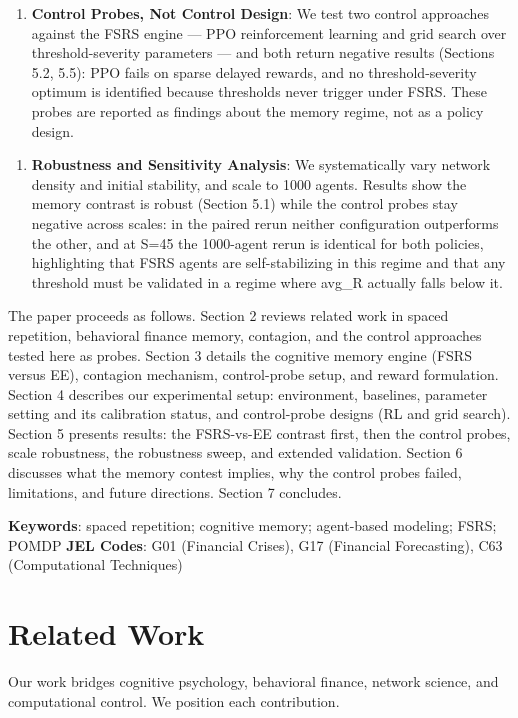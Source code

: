 \documentclass[11pt]{article}
\begin{document}
\begin{enumerate}
\item \textbf{Control Probes, Not Control Design}: We test two control approaches against the FSRS engine --- PPO reinforcement learning and grid search over threshold-severity parameters --- and both return negative results (Sections 5.2, 5.5): PPO fails on sparse delayed rewards, and no threshold-severity optimum is identified because thresholds never trigger under FSRS. These probes are reported as findings about the memory regime, not as a policy design.
\end{enumerate}

\begin{enumerate}
\item \textbf{Robustness and Sensitivity Analysis}: We systematically vary network density and initial stability, and scale to 1000 agents. Results show the memory contrast is robust (Section 5.1) while the control probes stay negative across scales: in the paired rerun neither configuration outperforms the other, and at S=45 the 1000-agent rerun is identical for both policies, highlighting that FSRS agents are self-stabilizing in this regime and that any threshold must be validated in a regime where avg\_R actually falls below it.
\end{enumerate}

The paper proceeds as follows. Section 2 reviews related work in spaced repetition, behavioral finance memory, contagion, and the control approaches tested here as probes. Section 3 details the cognitive memory engine (FSRS versus EE), contagion mechanism, control-probe setup, and reward formulation. Section 4 describes our experimental setup: environment, baselines, parameter setting and its calibration status, and control-probe designs (RL and grid search). Section 5 presents results: the FSRS-vs-EE contrast first, then the control probes, scale robustness, the robustness sweep, and extended validation. Section 6 discusses what the memory contest implies, why the control probes failed, limitations, and future directions. Section 7 concludes.

\textbf{Keywords}: spaced repetition; cognitive memory; agent-based modeling; FSRS; POMDP \textbf{JEL Codes}: G01 (Financial Crises), G17 (Financial Forecasting), C63 (Computational Techniques)

\section{Related Work}
Our work bridges cognitive psychology, behavioral finance, network science, and computational control. We position each contribution.
\end{document}
